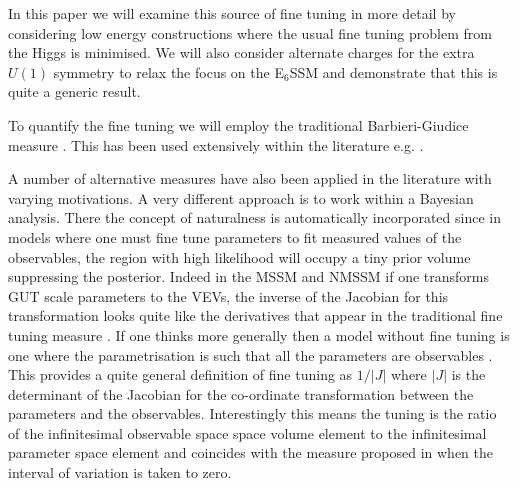 \documentclass[preprint,amsmath,amssymb,aps,superscriptaddress,prd,showpacs,floatfix]{revtex4-1}
\begin{document}
In this paper we will examine this source of fine tuning in more detail by considering low energy constructions where the usual fine tuning problem from the Higgs is minimised.   We will also consider  alternate charges for the extra $U(1)$ symmetry to relax the focus on the E$_6$SSM and demonstrate that this is quite a generic result.

To quantify the fine tuning we will employ the traditional
Barbieri-Giudice measure \cite{Ellis:1986yg,Barbieri:1987fn}.  This has
been used extensively within the literature
e.g. \cite{deCarlos:1993yy, deCarlos:1993ca, Chankowski:1997zh, Agashe:1997kn, Wright:1998mk, Kane:1998im, BasteroGil:1999gu, Feng:1999zg, Allanach:2000ii, Dermisek:2005ar, Barbieri:2005kf, Allanach:2006jc, Gripaios:2006nn, Dermisek:2006py, Barbieri:2006dq, Kobayashi:2006fh, Perelstein:2012qg, Antusch:2012gv,Cheng:2012pe, CahillRowley:2012rv, Ross:2012nr, Basak:2012bd, Kang:2012sy, Athron:2013ipa,Miller:2013jra, Binjonaid:2014oga, Miller:2014jza}.

A number of alternative measures have also been applied in the
literature \cite{Anderson:1994dz, Anderson:1994tr,
  Anderson:1995cp,Anderson:1996ew,Ciafaloni:1996zh,Chan:1997bi,
  Barbieri:1998uv,
  Giusti:1998gz,Casas:2003jx,Casas:2004uu,Casas:2004gh,Casas:2006bd,Kitano:2005wc,
  Athron:2007ry, Athron:2007qr, Baer:2012up} with varying motivations.
A very different approach is to work within a Bayesian analysis.
There the concept of naturalness is automatically incorporated since
in models where one must fine tune parameters to fit measured values
of the observables, the region with high likelihood will occupy a tiny
prior volume \cite{Allanach:2007qk, Cabrera:2008tj, Ghilencea:2012gz,
  Ghilencea:2012qk, Fichet:2012sn, Kim:2013uxa} suppressing the
posterior.  Indeed in the MSSM and NMSSM if one transforms GUT scale
parameters to the VEVs, the inverse of the Jacobian for this
transformation looks quite like the derivatives that appear in the
traditional fine tuning measure \cite{Allanach:2007qk, Cabrera:2008tj,
  Kim:2013uxa}.  If one thinks more generally then a model without
fine tuning is one where the parametrisation is such that all the
parameters are observables \cite{Fichet:2012sn, Kim:2013uxa}.  This
provides a quite general definition of fine tuning as $1/|J|$ where
$|J|$ is the determinant of the Jacobian for the co-ordinate
transformation between the parameters and the
observables. Interestingly this means the tuning is the ratio of the
infinitesimal observable space space volume element to the
infinitesimal parameter space element and coincides with the measure
proposed in \cite{Athron:2007ry} when the interval of variation is
taken to zero.
\end{document}
